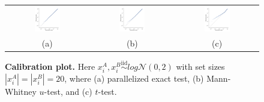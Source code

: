 \documentclass[a4paper]{article}
\begin{document}
\begin{figure}[H]
  \centering
  \begin{tabular}{ccc}
  \includegraphics[width=0.33\textwidth]{figures/calibration/large_calibration/e_Lnorm_0_1_50.png} & \includegraphics[width=0.33\textwidth]{figures/calibration/large_calibration/mw_Lnorm_0_1_50.png} & \includegraphics[width=0.33\textwidth]{figures/calibration/large_calibration/t_Lnorm_0_1_50.png} \\
  (a) & (b) & (c)
  
  \end{tabular}
  \caption{{\bf Calibration plot.} Here $x^A_i, x^B_i \stackrel{\text{iid}}{\sim} log\mathcal{N} (0 , 2)$ with set sizes $|x^A_i| = |x^B_i|=20$, where (a) parallelized exact test, (b) Mann-Whitney $u$-test, and (c) $t$-test.\label{fig:relerror}}
\end{figure}
\end{document}
